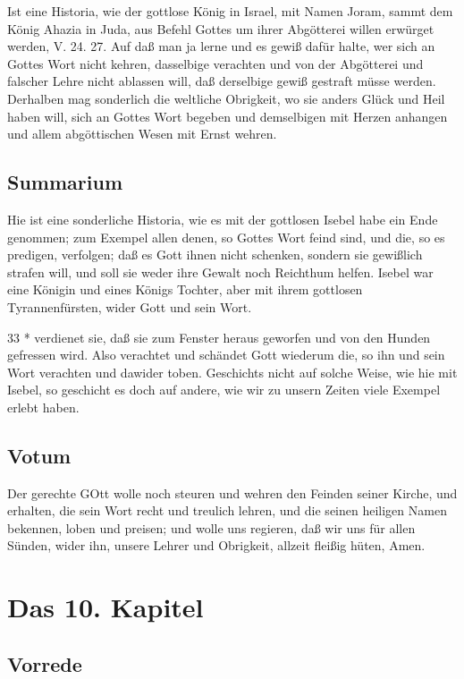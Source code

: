 Ist eine Historia, wie der gottlose König in Israel, mit Namen Joram, sammt dem König Ahazia in Juda, aus Befehl Gottes um ihrer Abgötterei willen erwürget werden, V. 24. 27. Auf daß man ja lerne und es gewiß dafür halte, wer sich an Gottes Wort nicht kehren, dasselbige verachten und von der Abgötterei und falscher Lehre nicht ablassen will, daß derselbige gewiß gestraft müsse werden. Derhalben mag sonderlich die weltliche Obrigkeit, wo sie anders Glück und Heil haben will, sich an Gottes Wort begeben und demselbigen mit Herzen anhangen und allem abgöttischen Wesen mit Ernst wehren.

\section{Summarium}

Hie ist eine sonderliche Historia, wie es mit der gottlosen Isebel habe ein Ende genommen; zum Exempel allen denen, so Gottes Wort feind sind, und die, so es predigen, verfolgen; daß es Gott ihnen nicht schenken, sondern sie gewißlich strafen will, und soll sie weder ihre Gewalt noch Reichthum helfen. Isebel war eine Königin und eines Königs Tochter, aber mit ihrem gottlosen Tyrannenfürsten, wider Gott und sein Wort.

33 *
verdienet sie, daß sie zum Fenster heraus geworfen und von den Hunden gefressen wird. Also verachtet und schändet Gott wiederum die, so ihn und sein Wort verachten und dawider toben. Geschichts nicht auf solche Weise, wie hie mit Isebel, so geschicht es doch auf andere, wie wir zu unsern Zeiten viele Exempel erlebt haben.

\section{Votum}

Der gerechte GOtt wolle noch steuren und wehren den Feinden seiner Kirche, und erhalten, die sein Wort recht und treulich lehren, und die seinen heiligen Namen bekennen, loben und preisen; und wolle uns regieren, daß wir uns für allen Sünden, wider ihn, unsere Lehrer und Obrigkeit, allzeit fleißig hüten, Amen.

\chapter{Das 10. Kapitel}

\section{Vorrede}


